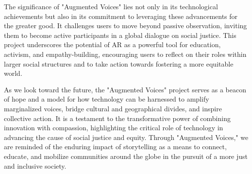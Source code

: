\documentclass[manuscript,screen]{acmart}
\begin{document}
The significance of "Augmented Voices" lies not only in its technological achievements but also in its commitment to leveraging these advancements for the greater good. It challenges users to move beyond passive observation, inviting them to become active participants in a global dialogue on social justice. This project underscores the potential of AR as a powerful tool for education, activism, and empathy-building, encouraging users to reflect on their roles within larger social structures and to take action towards fostering a more equitable world.

As we look toward the future, the "Augmented Voices" project serves as a beacon of hope and a model for how technology can be harnessed to amplify marginalized voices, bridge cultural and geographical divides, and inspire collective action. It is a testament to the transformative power of combining innovation with compassion, highlighting the critical role of technology in advancing the cause of social justice and equity. Through "Augmented Voices," we are reminded of the enduring impact of storytelling as a means to connect, educate, and mobilize communities around the globe in the pursuit of a more just and inclusive society.



\end{document}
